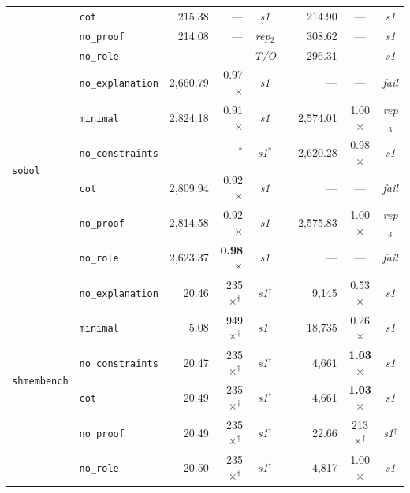 \begin{table}[t]
{\begin{tabular}{@{}llrrcrrcc@{}}
  & \texttt{cot}             & 215.38 & --- & \textit{s1}       && 214.90 & --- & \textit{s1}      \\
  & \texttt{no\_proof}       & 214.08 & --- & \textit{rep}$_2$  && 308.62 & --- & \textit{s1}      \\
  & \texttt{no\_role}        &    --- & --- & \textit{T/O}      && 296.31 & --- & \textit{s1}      \\
\midrule
\multirow{6}{*}{\texttt{sobol}}
  & \texttt{no\_explanation} & 2{,}660.79 & 0.97$\times$          & \textit{s1}      &&          --- & ---          & \textit{fail}    \\
  & \texttt{minimal}         & 2{,}824.18 & 0.91$\times$          & \textit{s1}      && 2{,}574.01   & 1.00$\times$ & \textit{rep}$_3$ \\
  & \texttt{no\_constraints} &        --- & ---$^*$               & \textit{s1}$^*$  && 2{,}620.28   & 0.98$\times$ & \textit{s1}      \\
  & \texttt{cot}             & 2{,}809.94 & 0.92$\times$          & \textit{s1}      &&          --- & ---          & \textit{fail}    \\
  & \texttt{no\_proof}       & 2{,}814.58 & 0.92$\times$          & \textit{s1}      && 2{,}575.83   & 1.00$\times$ & \textit{rep}$_3$ \\
  & \texttt{no\_role}        & 2{,}623.37 & \textbf{0.98}$\times$ & \textit{s1}      &&          --- & ---          & \textit{fail}    \\
\midrule
\multirow{6}{*}{\texttt{shmembench}}
  & \texttt{no\_explanation} &    20.46 & 235$\times^\dagger$          & \textit{s1}$^\dagger$ &&  9{,}145 & 0.53$\times$          & \textit{s1}           \\
  & \texttt{minimal}         &     5.08 & 949$\times^\dagger$          & \textit{s1}$^\dagger$ && 18{,}735 & 0.26$\times$          & \textit{s1}           \\
  & \texttt{no\_constraints} &    20.47 & 235$\times^\dagger$          & \textit{s1}$^\dagger$ &&  4{,}661 & \textbf{1.03}$\times$ & \textit{s1}           \\
  & \texttt{cot}             &    20.49 & 235$\times^\dagger$          & \textit{s1}$^\dagger$ &&  4{,}661 & \textbf{1.03}$\times$ & \textit{s1}           \\
  & \texttt{no\_proof}       &    20.49 & 235$\times^\dagger$          & \textit{s1}$^\dagger$ &&    22.66 & 213$\times^\dagger$   & \textit{s1}$^\dagger$ \\
  & \texttt{no\_role}        &    20.50 & 235$\times^\dagger$          & \textit{s1}$^\dagger$ &&  4{,}817 & 1.00$\times$          & \textit{s1}           \\
\bottomrule
\end{tabular}%
}
\end{table}
